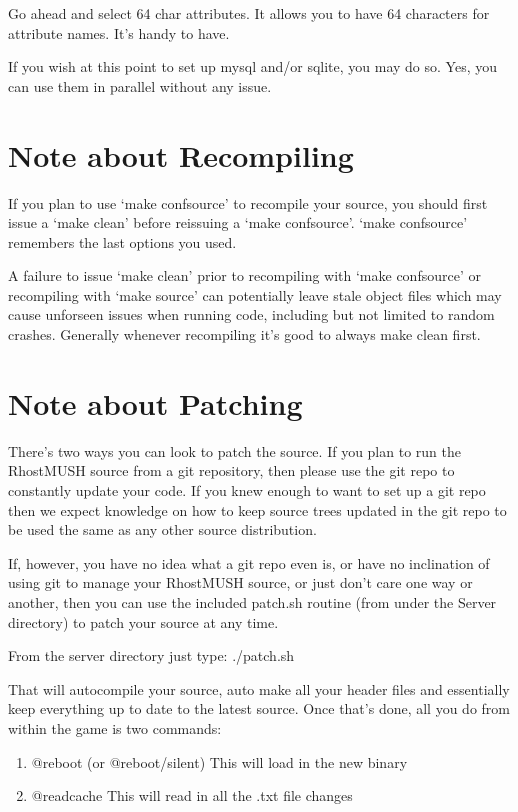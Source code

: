 \documentclass[letterpaper,10pt,english]{sphinxmanual}
\begin{document}
\sphinxAtStartPar
Go ahead and select 64 char attributes.  It allows you to have 64 characters
for attribute names.  It’s handy to have.

\sphinxAtStartPar
If you wish at this point to set up mysql and/or sqlite, you  may do so.
Yes, you can use them in parallel without any issue.


\section{Note about Recompiling}
\label{\detokenize{02-compile:note-about-recompiling}}
\sphinxAtStartPar
If you plan to use ‘make confsource’ to recompile your source, you should first
issue a ‘make clean’ before re\sphinxhyphen{}issuing a ‘make confsource’.  ‘make confsource’
remembers the last options you used.

\sphinxAtStartPar
A failure to issue ‘make clean’ prior to re\sphinxhyphen{}compiling with ‘make confsource’ or
re\sphinxhyphen{}compiling with ‘make source’ can potentially leave stale object files which
may cause unforseen issues when running code, including but not limited to
random crashes.  Generally whenever recompiling it’s good to always make clean
first.


\section{Note about Patching}
\label{\detokenize{02-compile:note-about-patching}}
\sphinxAtStartPar
There’s two ways you can look to patch the source.  If you plan to run the
RhostMUSH source from a git repository, then please use the git repo to
constantly update your code.  If you knew enough to want to set up a git repo
then we expect knowledge on how to keep source trees updated in the git repo
to be used the same as any other source distribution.

\sphinxAtStartPar
If, however, you have no idea what a git repo even is, or have no inclination
of using git to manage your RhostMUSH source, or just don’t care one way
or another, then you can use the included patch.sh routine (from under the
Server directory) to patch your source at any time.

\sphinxAtStartPar
From the server directory just type: ./patch.sh

\sphinxAtStartPar
That will auto\sphinxhyphen{}compile your source, auto make all your header files and
essentially keep everything up to date to the latest source.
Once that’s done, all you do from within the game is two commands:
\begin{enumerate}
%
\item {} 
\sphinxAtStartPar
@reboot (or @reboot/silent)  \textendash{} This will load in the new binary

\item {} 
\sphinxAtStartPar
@readcache  \textendash{} This will read in all the .txt file changes

\end{enumerate}
\end{document}
